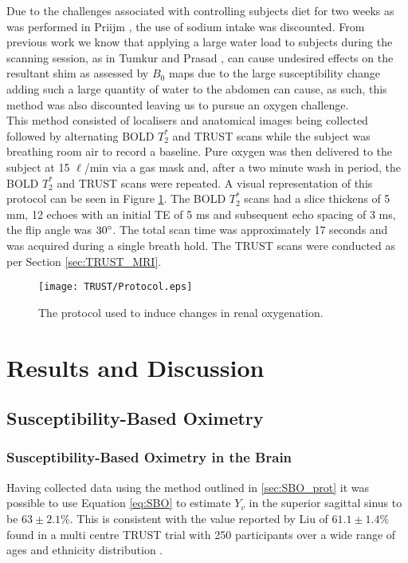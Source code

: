 Due to the challenges associated with controlling subjects diet for two weeks as was performed in Priijm \cite{pruijm_effect_2010}, the use of sodium intake was discounted. From previous work we know that applying a large water load to subjects during the scanning session, as in Tumkur and Prasad  \cite{tumkur_evaluation_2006, prasad_changes_1999}, can cause undesired effects on the resultant shim as assessed by $B_0$ maps due to the large susceptibility change adding such a large quantity of water to the abdomen can cause, as such, this method was also discounted leaving us to pursue an oxygen challenge.\\

This method consisted of localisers and anatomical images being collected followed by alternating \ac{BOLD} $T_2^*$ and \ac{TRUST} scans while the subject was breathing room air to record a baseline. Pure oxygen was then delivered to the subject at 15 $\ell$/min via a gas mask and, after a two minute wash in period, the \ac{BOLD} $T_2^*$ and \ac{TRUST} scans were repeated. A visual representation of this protocol can be seen in Figure \ref{fig:oxygen_challenge_protocol}. The \ac{BOLD} $T_2^*$ scans had a slice thickens of 5 mm, 12 echoes with an initial \ac{TE} of 5 ms and subsequent echo spacing of 3 ms, the flip angle was $30\degree$. The total scan time was approximately 17 seconds and was acquired during a single breath hold. The \ac{TRUST} scans were conducted as per Section \ref{sec:TRUST_MRI}.\\

\begin{figure}[H]
	\centering
	\texttt{[image: TRUST/Protocol.eps]}
	\caption{The protocol used to induce changes in renal oxygenation.}
	\label{fig:oxygen_challenge_protocol}	
\end{figure}

\newpage
\section{Results and Discussion}
\subsection{Susceptibility-Based Oximetry}
\subsubsection{Susceptibility-Based Oximetry in the Brain}

Having collected data using the method outlined in \ref{sec:SBO_prot} it was possible to use Equation \eqref{eq:SBO} to estimate $Y_v$ in the superior sagittal sinus to be $63\pm2.1\%$. This is consistent with the value reported by Liu of $61.1\pm1.4\%$ found in a multi centre \ac{TRUST} trial with 250 participants over a wide range of ages and ethnicity distribution \cite{liu_multi-site_2016}.

